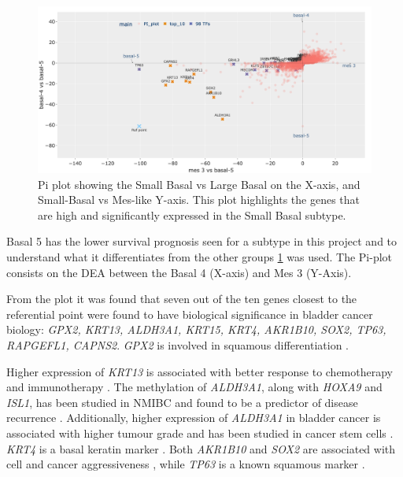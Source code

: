 \begin{figure}[!htb]   
    \centering
    \includegraphics[width=1.0\textwidth,keepaspectratio]{Sections/Network_I/Resources/selective_pruning/pi_gsea/pi_smallBasal.png}
      \caption[Pi-plot to study the Basal group with lowest survival]{Pi plot showing the Small Basal vs Large Basal on the X-axis, and Small-Basal vs Mes-like Y-axis. This plot highlights the genes that are high and significantly expressed in the Small Basal subtype. }
    \label{fig:N_I:pi_smallBasal_comp}
\end{figure}

Basal 5 has the lower survival prognosis seen for a subtype in this project and to understand what it differentiates from the other groups \cref{fig:N_I:pi_smallBasal_comp} was used. The Pi-plot consists on the DEA between the Basal 4 (X-axis) and Mes 3 (Y-Axis).

From the plot it was found that seven out of the ten genes closest to the referential point were found to have biological significance in bladder cancer biology: \textit{GPX2, KRT13, ALDH3A1, KRT15, KRT4, AKR1B10, SOX2, TP63, RAPGEFL1, CAPNS2}. \textit{GPX2} is involved in squamous differentiation \citet{Naiki2018-fp}. 

Higher expression of \textit{KRT13} is associated with better response to chemotherapy and immunotherapy \citep{Yu2023-db}. The methylation of \textit{ALDH3A1}, along with \textit{HOXA9} and \textit{ISL1}, has been studied in \gls{NMIBC} and found to be a predictor of disease recurrence \citep{McLean2023-qk}. Additionally, higher expression of \textit{ALDH3A1} in bladder cancer is associated with higher tumour grade and has been studied in cancer stem cells \citet{Kim2013-th}. \textit{KRT4} is a basal keratin marker \citep{Marzouka2018-ge}. Both \textit{AKR1B10} and \textit{SOX2} are associated with cell and cancer aggressiveness \citep{Huang2021-bn, Chiu2020-xh}, while \textit{TP63} is a known squamous marker \citep{Robertson2017-mg}. 

